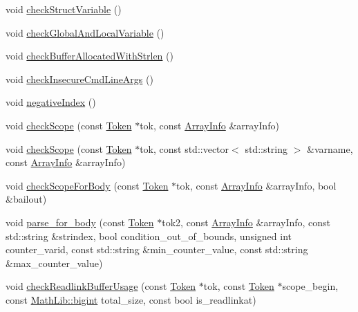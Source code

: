 \begin{DoxyCompactItemize}
void \hyperlink{class_check_buffer_overrun_af902d1058c19edbfa9360d96e0b52618}{check\-Struct\-Variable} ()
\item 
void \hyperlink{class_check_buffer_overrun_af3d1d363b22f3ee8573447b08714ce85}{check\-Global\-And\-Local\-Variable} ()
\item 
void \hyperlink{class_check_buffer_overrun_aa48b2092cfbe4c0a70a0317ae4661ecf}{check\-Buffer\-Allocated\-With\-Strlen} ()
\item 
void \hyperlink{class_check_buffer_overrun_af64df625129b153c9d23bff89e2cbd18}{check\-Insecure\-Cmd\-Line\-Args} ()
\item 
void \hyperlink{class_check_buffer_overrun_a44e4545d42f9f84ee3db00001ee7124c}{negative\-Index} ()
\item 
void \hyperlink{class_check_buffer_overrun_aa5df4a4008c9530157522f15b00a1a32}{check\-Scope} (const \hyperlink{class_token}{Token} $\ast$tok, const \hyperlink{class_check_buffer_overrun_1_1_array_info}{Array\-Info} \&array\-Info)
\item 
void \hyperlink{class_check_buffer_overrun_a827fbba366d3ff8398776cd8ab6a3a6a}{check\-Scope} (const \hyperlink{class_token}{Token} $\ast$tok, const std\-::vector$<$ std\-::string $>$ \&varname, const \hyperlink{class_check_buffer_overrun_1_1_array_info}{Array\-Info} \&array\-Info)
\item 
void \hyperlink{class_check_buffer_overrun_a23c7fa8a6c1b3e3df10f6f6b264d28ed}{check\-Scope\-For\-Body} (const \hyperlink{class_token}{Token} $\ast$tok, const \hyperlink{class_check_buffer_overrun_1_1_array_info}{Array\-Info} \&array\-Info, bool \&bailout)
\item 
void \hyperlink{class_check_buffer_overrun_af4fe893bb9e3b4d402467bfc201acb01}{parse\-\_\-for\-\_\-body} (const \hyperlink{class_token}{Token} $\ast$tok2, const \hyperlink{class_check_buffer_overrun_1_1_array_info}{Array\-Info} \&array\-Info, const std\-::string \&strindex, bool condition\-\_\-out\-\_\-of\-\_\-bounds, unsigned int counter\-\_\-varid, const std\-::string \&min\-\_\-counter\-\_\-value, const std\-::string \&max\-\_\-counter\-\_\-value)
\item 
void \hyperlink{class_check_buffer_overrun_aee754a297691842bab044286ee10cef8}{check\-Readlink\-Buffer\-Usage} (const \hyperlink{class_token}{Token} $\ast$tok, const \hyperlink{class_token}{Token} $\ast$scope\-\_\-begin, const \hyperlink{class_math_lib_aea370b3be964c5704b6244d757fcac99}{Math\-Lib\-::bigint} total\-\_\-size, const bool is\-\_\-readlinkat)
\item 

\end{DoxyCompactItemize}
